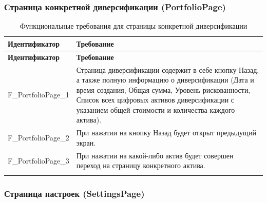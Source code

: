 \documentclass[a4paper, 14pt]{article}
\begin{document}
\subsubsection{Страница конкретной диверсификации (PortfolioPage)}

\begin{longtable}{| p{} | p{} |}
    \hline
    \textbf{Идентификатор}          & \textbf{Требование}                                                                                                                                                                \\
    \hline
    \endfirsthead
    \hline
    \textbf{Идентификатор}          & \textbf{Требование}                                                                                                                                                                \\
    \hline
    \endhead

    F\_PortfolioPage\_1       & Страница диверсификации содержит в себе кнопку Назад, а также полную информацию о диверсификации (Дата и время создания, Общая сумма, Уровень рискованности, Список всех цифровых активов диверсификации с указанием общей стоимости и количества каждого актива).      \\ \hline
    F\_PortfolioPage\_2       & При нажатии на кнопку Назад будет открыт предыдущий экран.                                                                                                                         \\ \hline
    F\_PortfolioPage\_3       & При нажатии на какой-либо актив будет совершен переход на страницу конкретного актива.                                                                                             \\ \hline

    \caption{Функциональные требования для страницы конкретной диверсификации}
\end{longtable}

\subsubsection{Страница настроек (SettingsPage)}
\end{document}
